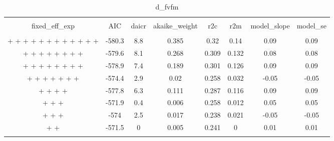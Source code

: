 
\begin{table}[!htbp] \centering 
  \caption{d_fvfm} 
  \label{d_fvfm} 
\begin{tabular}{@{\extracolsep{5pt}} cccccccc} 
\\[-1.8ex]\hline 
\hline \\[-1.8ex] 
fixed\_eff\_exp & AIC & daicr & akaike\_weight & r2c & r2m & model\_slope & model\_se \\ 
\hline \\[-1.8ex] 
 +  +  +  +  +  +  +  +  +  +  +  +  & -580.3 & 8.8 & 0.385 & 0.32 & 0.14 & 0.09 & 0.09 \\ 
 +  +  +  +  +  +  +  +  & -579.6 & 8.1 & 0.268 & 0.309 & 0.132 & 0.08 & 0.08 \\ 
 +  +  +  +  +  +  +  +  & -578.9 & 7.4 & 0.189 & 0.301 & 0.126 & 0.09 & 0.09 \\ 
 +  +  +  +  +  +  +  & -574.4 & 2.9 & 0.02 & 0.258 & 0.032 & -0.05 & -0.05 \\ 
 +  +  +  +  & -577.8 & 6.3 & 0.111 & 0.287 & 0.116 & 0.09 & 0.09 \\ 
 +  +  +  & -571.9 & 0.4 & 0.006 & 0.258 & 0.012 & 0.05 & 0.05 \\ 
 +  +  +  & -574 & 2.5 & 0.017 & 0.238 & 0.021 & -0.05 & -0.05 \\ 
 +  +  & -571.5 & 0 & 0.005 & 0.241 & 0 & 0.01 & 0.01 \\ 
\hline \\[-1.8ex] 
\end{tabular} 
\end{table} 
